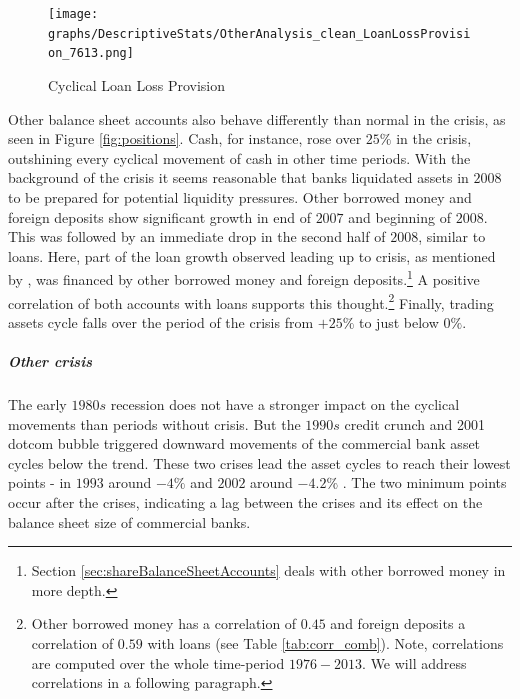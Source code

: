 \documentclass[12pt, a4paper]{article} %
\begin{document}
\begin{figure}[H]
\begin{minipage}{\textwidth}
\texttt{[image: graphs/DescriptiveStats/OtherAnalysis\_clean\_LoanLossProvision\_7613.png]}
\caption[1]{Cyclical Loan Loss Provision}
\label{fig:loan_loss_provision}
\end{minipage}
\end{figure}

Other balance sheet accounts also behave differently than normal in the crisis, as seen in Figure \ref{fig:positions}.
Cash, for instance, rose over $25\%$ in the crisis, outshining every cyclical movement of cash in other time periods. With the background of the crisis it seems reasonable that banks liquidated assets in $2008$ to be prepared for potential liquidity pressures. 
Other borrowed money and foreign deposits show significant growth in end of $2007$ and beginning of $2008$. This was followed by an immediate drop in the second half of $2008$, similar to loans. Here, part of the loan growth observed leading up to crisis, as mentioned by \citet{bassett2008profits}, was financed by other borrowed money and foreign deposits.\footnote{Section \ref{sec:shareBalanceSheetAccounts} deals with other borrowed money in more depth.} A positive correlation of both accounts with loans supports this thought.\footnote{Other borrowed money has a correlation of $0.45$ and foreign deposits a correlation of $0.59$ with loans (see Table \ref{tab:corr_comb}). Note, correlations are computed over the whole time-period $1976-2013$. We will address correlations in a following paragraph.
} 
Finally, trading assets cycle falls over the period of the crisis from $+25\%$ to just below $0\%$.



\subparagraph{Other crisis}
The early $1980s$ recession does not have a stronger impact on the cyclical movements than periods without crisis. But the $1990s$ credit crunch and 2001 dotcom bubble triggered downward movements of the commercial bank asset cycles below the trend. These two crises lead the asset cycles to reach their lowest points - in $1993$ around $-4\%$ and $2002$ around $-4.2\%$ . The two minimum points occur after the crises, indicating a lag between the crises and its effect on the balance sheet size of commercial banks.
\end{document}
